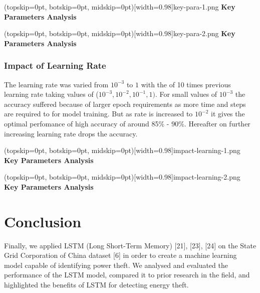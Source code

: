 \documentclass{ieeeaccess}
\begin{document}
\Figure[ht](topskip=0pt, botskip=0pt, midskip=0pt)[width=0.98\linewidth]{key-para-1.png}
{ \textbf{Key Parameters Analysis}\label{fig16}}

\Figure[t!](topskip=0pt, botskip=0pt, midskip=0pt)[width=0.98\linewidth]{key-para-2.png}
{ \textbf{Key Parameters Analysis}\label{fig17}}

\subsubsection{Impact of Learning Rate}
The learning rate was varied from \(10^{-3}\) to \(1\) with the of 10 times previous learning rate taking values of (\(10^{-3}, 10^{-2}, 10^{-1}, 1)\). For small values of \(10^{-3}\) the accuracy suffered because of larger epoch requirements as more time and steps are required to for model training. But as rate is increased to \(10^{-2}\) it gives the optimal perfomance of high accuracy of around 85\% - 90\%. 
Hereafter on further increasing learning rate drops the accuracy.

\Figure[t!](topskip=0pt, botskip=0pt, midskip=0pt)[width=0.98\linewidth]{impact-learning-1.png}
{ \textbf{Key Parameters Analysis}\label{fig18}}

\Figure[t!](topskip=0pt, botskip=0pt, midskip=0pt)[width=0.98\linewidth]{impact-learning-2.png}
{ \textbf{Key Parameters Analysis}\label{fig19}}

\section{Conclusion}
Finally, we applied LSTM (Long Short-Term Memory) [21], [23], [24] on the State Grid Corporation of China dataset [6] in order to create a machine learning model capable of identifying power theft. We analysed and evaluated the performance of the LSTM model, compared it to prior research in the field, and highlighted the benefits of LSTM for detecting energy theft.
\end{document}
